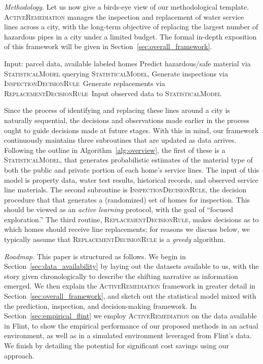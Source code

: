 \documentclass[sigconf]{acmart}
\def\statmodel{\textsc{StatisticalModel}\xspace}
\def\druleHVI{\textsc{InspectionDecisionRule}\xspace}
\def\druleSLR{\textsc{ReplacementDecisionRule}\xspace}
\def\activerem{\textsc{ActiveRemediation}\xspace}
\begin{document}
 \emph{Methodology.} Let us now give a birds-eye view of our methodological template. \activerem manages the inspection and replacement of water service lines across a city, with the long-term objective of replacing the largest number of hazardous pipes in a city under a limited budget. The formal in-depth exposition of this framework will be given in Section~\ref{sec:overall_framework}.


\begin{algorithm}
\caption{\activerem}\label{alg:overview}
\begin{algorithmic}[1]
\State Input: parcel data, available labeled homes
    \State Predict hazardous/safe material via \statmodel
     querying \statmodel,
        \State Generate inspections via \druleHVI\
        \State Generate replacements via \druleSLR\
        \State Input observed data to \statmodel
    \EndIf
\EndFor
\end{algorithmic}
\end{algorithm}

Since the process of identifying and replacing these lines around a city is naturally sequential, the decisions and observations made earlier in the process ought to guide decisions made at future stages. With this in mind, our framework continuously maintains three subroutines that are updated as data arrives. Following the outline in Algorithm~\ref{alg:overview}, the first of these is a \statmodel, that generates probabilistic estimates of the material type of both the public and private portion of each home's service lines. The input of this model is property data, water test results, historical records, and observed service line materials. The second subroutine is \druleHVI, the decision procedure that that generates a (randomized) set of homes for inspection. This should be viewed as an \emph{active learning} protocol, with the goal of ``focused exploration.'' The third routine, \druleSLR, makes decisions as to which homes should receive line replacements; for reasons we discuss below, we typically assume that \druleSLR is a \emph{greedy} algorithm.



\emph{Roadmap.} This paper is structured as follows. We begin in Section~\ref{sec:data_availability} by laying out the datasets available to us, with the story given chronologically to describe the shifting narrative as information emerged. We then explain the \activerem framework in greater detail in Section~\ref{sec:overall_framework}, and sketch out the statistical model mixed with the prediction, inspection, and decision-making framework. In Section~\ref{sec:empirical_flint} we employ \activerem on the data available in Flint, to show the empirical performance of our proposed methods in an actual environment, as well as in a simulated environment leveraged from Flint's data. We finish by detailing the potential for significant cost savings using our approach.
\end{document}
